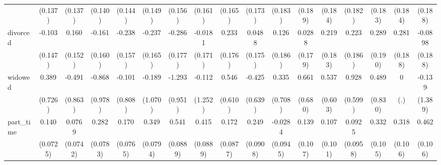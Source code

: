 {\begin{tabular}{l*{16}{c}}
                    &     (0.137)         &     (0.137)         &     (0.140)         &     (0.144)         &     (0.149)         &     (0.156)         &     (0.161)         &     (0.165)         &     (0.173)         &     (0.183)         &     (0.189)         &     (0.184)         &     (0.182)         &     (0.183)         &     (0.184)         &     (0.188)         \\
[1em]
divorced            &      -0.103         &       0.160         &      -0.161         &      -0.238         &      -0.237         &      -0.286         &     -0.0181         &       0.233         &      0.0488         &       0.126         &      0.0288         &       0.219         &       0.223         &       0.289         &       0.281         &     -0.0898         \\
                    &     (0.147)         &     (0.152)         &     (0.160)         &     (0.157)         &     (0.165)         &     (0.177)         &     (0.171)         &     (0.176)         &     (0.175)         &     (0.186)         &     (0.179)         &     (0.183)         &     (0.186)         &     (0.190)         &     (0.188)         &     (0.188)         \\
[1em]
widowed             &       0.389         &      -0.491         &      -0.868         &      -0.101         &      -0.189         &      -1.293         &      -0.112         &       0.546         &      -0.425         &       0.335         &       0.661         &       0.537         &       0.928         &       0.489         &           0         &      -0.139         \\
                    &     (0.726)         &     (0.863)         &     (0.978)         &     (0.808)         &     (1.070)         &     (0.951)         &     (1.252)         &     (0.610)         &     (0.639)         &     (0.708)         &     (0.680)         &     (0.603)         &     (0.599)         &     (0.830)         &         (.)         &     (1.389)         \\
[1em]
part\_time           &       0.140         &      0.0769         &       0.282\sym{***}&       0.170\sym{*}  &       0.349\sym{***}&       0.541\sym{***}&       0.415\sym{***}&       0.172         &       0.249\sym{**} &     -0.0284         &       0.139         &       0.107         &      0.0925         &       0.332\sym{**} &       0.318\sym{**} &       0.462\sym{***}\\
                    &    (0.0725)         &    (0.0742)         &    (0.0783)         &    (0.0765)         &    (0.0794)         &    (0.0889)         &    (0.0889)         &    (0.0877)         &    (0.0908)         &    (0.0945)         &     (0.107)         &     (0.101)         &    (0.0958)         &     (0.105)         &     (0.106)         &     (0.106)         \\

\end{tabular}}
